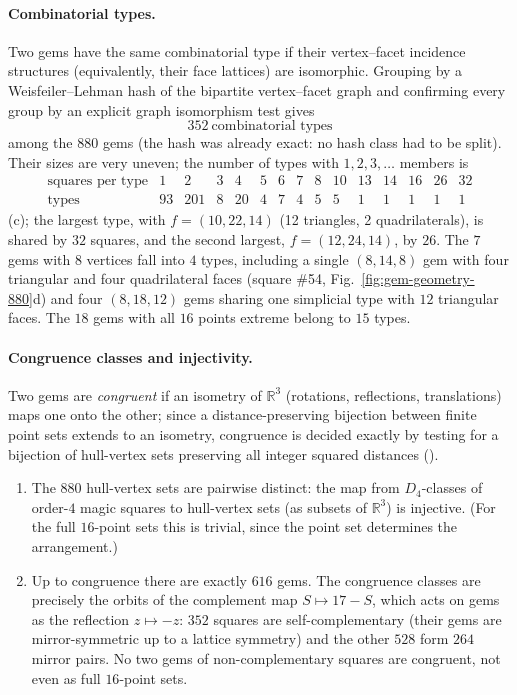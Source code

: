 \paragraph{Combinatorial types.}
Two gems have the same combinatorial type if their vertex--facet incidence
structures (equivalently, their face lattices) are isomorphic.  Grouping by a
Weisfeiler--Lehman hash of the bipartite vertex--facet graph and confirming
every group by an explicit graph isomorphism test gives
\[
352\ \text{combinatorial types}
\]
among the $880$ gems (the hash was already exact: no hash class had to be
split).  Their sizes are very uneven; the number of types with $1,2,3,\dots$ members is
\[
\begin{array}{r|rrrrrrrrrrrrrr}
\text{squares per type} & 1&2&3&4&5&6&7&8&10&13&14&16&26&32\\\hline
\text{types} & 93&201&8&20&4&7&4&5&5&1&1&1&1&1
\end{array}
\]
(c); the largest type, with $f=(10,22,14)$ (12 triangles,
2 quadrilaterals), is shared by $32$ squares, and the second largest,
$f=(12,24,14)$, by $26$.  The $7$ gems with $8$ vertices fall into $4$ types,
including a single $(8,14,8)$ gem with four triangular and four quadrilateral
faces (square \#54, Fig.~\ref{fig:gem-geometry-880}d) and four
$(8,18,12)$ gems sharing one simplicial type with $12$ triangular faces.  The $18$ gems with all $16$ points
extreme belong to $15$ types.

\paragraph{Congruence classes and injectivity.}
Two gems are \emph{congruent} if an isometry of $\mathbb R^3$ (rotations, reflections, translations) maps one onto the
other; since a distance-preserving bijection between finite point sets extends to an isometry, congruence is decided exactly
by testing for a bijection of hull-vertex sets preserving all integer squared distances ().

\begin{proposition}
\label{prop:gem-injective}
\begin{enumerate}
\item The $880$ hull-vertex sets are pairwise distinct: the map from
  $D_4$-classes of order-$4$ magic squares to hull-vertex sets (as subsets of
  $\mathbb R^3$) is injective.  (For the full $16$-point sets this is trivial, since the point set determines the
  arrangement.)
\item Up to congruence there are exactly $616$ gems.  The congruence classes
  are precisely the orbits of the complement map $S\mapsto 17-S$, which acts
  on gems as the reflection $z\mapsto -z$: $352$ squares are
  self-complementary (their gems are mirror-symmetric up to a lattice
  symmetry) and the other $528$ form $264$ mirror pairs.  No two gems of
  non-complementary squares are congruent, not even as full $16$-point sets.
\end{enumerate}
\end{proposition}

